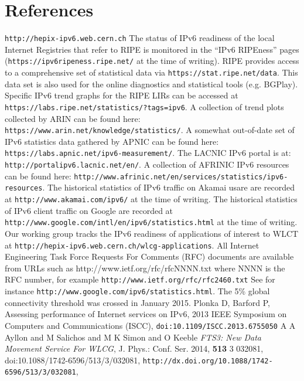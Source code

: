 \section*{References}

\begin{thebibliography}{1}
 {\tt http://hepix-ipv6.web.cern.ch}
 The status of IPv6 readiness of the local Internet Registries
that refer to RIPE is monitored in the ``IPv6 RIPEness'' pages ({\tt https://ipv6ripeness.ripe.net/} at the time of writing). 
 RIPE provides access to a comprehensive set of statistical
data via {\tt https://stat.ripe.net/data}. This data set is also used for
the online diagnostics and statistical tools (e.g. BGPlay). 
 Specific
IPv6 trend graphs for the RIPE LIRs can be accessed at {\tt https://labs.ripe.net/statistics/?tags=ipv6}.
 A collection of trend plots collected by ARIN
can be found here: {\tt https://www.arin.net/knowledge/statistics/}.
 A somewhat out-of-date set of IPv6
statistics data gathered by APNIC can be found here: {\tt https://labs.apnic.net/ipv6-measurement/}.
 The LACNIC IPv6 portal is at: {\tt http://portalipv6.lacnic.net/en/}.
 A collection of AFRINIC IPv6 resources can be found here: {\tt http://www.afrinic.net/en/services/statistics/ipv6-resources}.
 The historical statistics of IPv6 traffic on Akamai usare are recorded
at {\tt http://www.akamai.com/ipv6/} at the time of writing.
 The historical statistics of IPv6 client traffic on Google are recorded
at {\tt http://www.google.com/intl/en/ipv6/statistics.html} at the time of writing.
 Our working group tracks the IPv6 readiness of applications
of interest to WLCT at {\tt http://hepix-ipv6.web.cern.ch/wlcg-applications}.
 All Internet Engineering Task Force Requests For Comments (RFC) documents are available
from URLs such as http://www.ietf.org/rfc/rfcNNNN.txt where NNNN is the RFC number, for example {\tt http://www.ietf.org/rfc/rfc2460.txt}
 See for instance {\tt http://www.google.com/ipv6/statistics.html}. The 5\% global connectivity threshold was crossed in January 2015.
 Plonka D, Barford P, Assessing performance of Internet services on IPv6, 2013 IEEE Symposium on Computers and Communications (ISCC), {\tt doi:10.1109/ISCC.2013.6755050}
 {A A Ayllon and M Salichos and M K Simon and O Keeble} {\it {FTS}3: New Data Movement Service For {WLCG}}, {J. Phys.: Conf. Ser.} 2014, {\bf 513} 3 032081,  doi:{10.1088/1742-6596/513/3/032081}, {\tt{http://dx.doi.org/10.1088/1742-6596/513/3/032081}},
\end{thebibliography}
